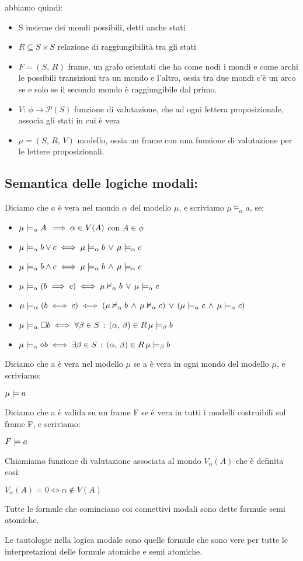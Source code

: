 abbiamo quindi:
\begin{itemize}
\item S insieme dei mondi possibili, detti anche stati
\item $R\subseteq S\times S$ relazione di raggiungibilità tra gli stati
\item $F=(S,\, R)$ frame, un grafo orientati che ha come nodi i mondi e
come archi le possibili transizioni tra un mondo e l'altro, ossia
tra due mondi c'è un arco se e solo se il secondo mondo è raggiungibile
dal primo.
\item $V:\,\phi\longrightarrow\mathcal{P}(S)$ funzione di valutazione,
che ad ogni lettera proposizionale, associa gli stati in cui è vera
\item $\mu=(S,\, R,\, V)$ modello, ossia un frame con una funzione di valutazione
per le lettere proposizionali.
\end{itemize}

\subsection{Semantica delle logiche modali:}

Diciamo che $a$ è vera nel mondo $\alpha$ del modello $\mu$, e
scriviamo $\mu\models_{\alpha}a$, se:
\begin{itemize}
\item $\mu\models_{\alpha}A\,\implies\alpha\in V(A)$ con $A\in\phi$ 
\item $\mu\models_{\alpha}b\vee c\iff\mu\models_{\alpha}b\,\vee\,\mu\models_{\alpha}c$
\item $\mu\models_{\alpha}b\wedge c\iff\mu\models_{\alpha}b\,\wedge\,\mu\models_{\alpha}c$
\item $\mu\models_{\alpha}(b\implies c)\iff\mu\nvDash_{\alpha}b\,\vee\,\mu\models_{\alpha}c$
\item $\mu\models_{\alpha}(b\iff c)\iff(\mu\nvDash_{\alpha}b\,\wedge\,\mu\nvDash_{\alpha}c)\,\vee\,(\mu\models_{\alpha}c\,\wedge\,\mu\models_{\alpha}c)$
\item $\mu\models_{\alpha}\square b\iff\forall\beta\in S\,:\,(\alpha,\,\beta)\in R\,\mu\models_{\beta}b$
\item $\mu\models_{\alpha}\diamond b\iff\exists\beta\in S\,:\,(\alpha,\,\beta)\in R\,\mu\models_{\beta}b$
\end{itemize}
Diciamo che a è vera nel modello $\mu$ se a è vera in ogni mondo
del modello $\mu$, e scriviamo:

$\mu\models a$ 

Diciamo che a è valida su un frame F se è vera in tutti i modelli
costruibili sul frame F, e scriviamo:

$F\models a$

Chiamiamo funzione di valutazione associata al mondo $V_{\alpha}(A)$
che è definita così:

$V_{\alpha}(A)=0\iff\alpha\notin V(A)$

Tutte le formule che cominciano coi connettivi modali sono dette formule
semi atomiche.

Le tautologie nella logica modale sono quelle formule che sono vere
per tutte le interpretazioni delle formule atomiche e semi atomiche.
